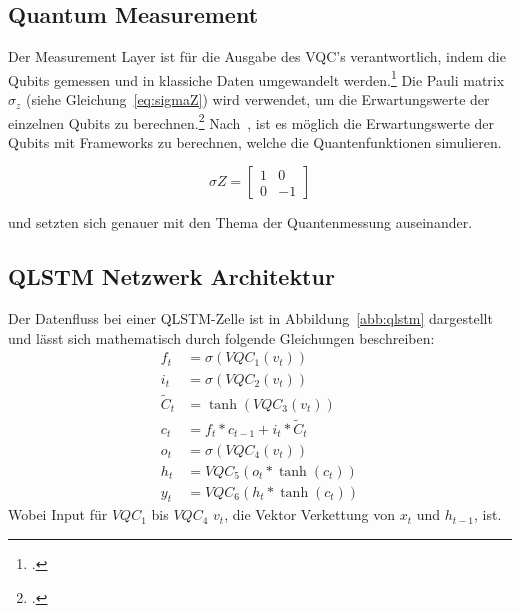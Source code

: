 \subsection{Quantum Measurement}

Der Measurement Layer ist für die Ausgabe des \ac{VQC}'s verantwortlich, indem die Qubits gemessen und in klassiche Daten umgewandelt werden.\footcite[Vgl.][S. 2]{Cao2023}
Die Pauli matrix $\sigma_z$ (siehe Gleichung~\ref{eq:sigmaZ}) wird verwendet, um die Erwartungswerte der einzelnen Qubits zu berechnen.\footcite[Vgl.][S. 4]{Yu2023}
Nach~\cite[][]{Yu2023}, ist es möglich die Erwartungswerte der Qubits mit Frameworks zu berechnen, welche die Quantenfunktionen simulieren.

\begin{equation}
    \label{eq:sigmaZ}
    \sigma Z = \begin{bmatrix} 1 & 0 \\ 0 & -1 \end{bmatrix}
\end{equation}

\cite[][]{Busch2016} \cite[][]{Braginsky1995} und \cite[][]{Wiseman2010} setzten sich genauer mit den Thema der Quantenmessung auseinander.


\subsection{QLSTM Netzwerk Architektur}\label{qlstmArch}

Der Datenfluss bei einer \ac{QLSTM}-Zelle ist in Abbildung~\ref{abb:qlstm} dargestellt und lässt sich mathematisch durch folgende Gleichungen beschreiben:
\begin{align}
    f_t &= \sigma(VQC_1(v_t))  \\
    i_t &= \sigma(VQC_2(v_t))  \\
    \widetilde{C}_t &= \tanh(VQC_3(v_t))  \\
    c_t &= f_t \ast c_{t-1} + i_t \ast \widetilde{C}_t  \\
    o_t &= \sigma(VQC_4(v_t))  \\
    h_t &= VQC_5(o_t \ast \tanh(c_t)) \\
    y_t &= VQC_6(h_t \ast \tanh(c_t))
\end{align}
Wobei Input für $VQC_1$ bis $VQC_4$ $v_t$, die Vektor Verkettung von $x_t$ und $h_{t-1}$, ist.

